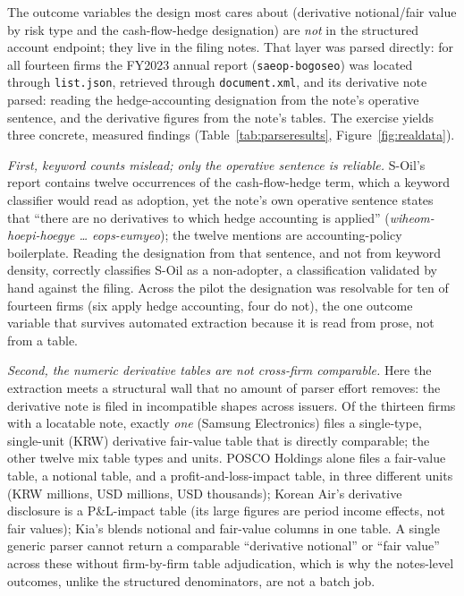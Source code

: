 \documentclass[11pt,a4paper]{article}
\begin{document}
The outcome variables the design most cares about (derivative notional/fair value by risk type and the cash-flow-hedge designation) are \emph{not} in the structured account endpoint; they live in the filing notes. That layer was parsed directly: for all fourteen firms the FY2023 annual report (\texttt{saeop-bogoseo}) was located through \texttt{list.json}, retrieved through \texttt{document.xml}, and its derivative note parsed: reading the hedge-accounting designation from the note's operative sentence, and the derivative figures from the note's tables. The exercise yields three concrete, measured findings (Table~\ref{tab:parseresults}, Figure~\ref{fig:realdata}).

\emph{First, keyword counts mislead; only the operative sentence is reliable.} S-Oil's report contains twelve occurrences of the cash-flow-hedge term, which a keyword classifier would read as adoption, yet the note's own operative sentence states that ``there are no derivatives to which hedge accounting is applied'' (\emph{wiheom-hoepi-hoegye \ldots{} eops-eumyeo}); the twelve mentions are accounting-policy boilerplate. Reading the designation from that sentence, and not from keyword density, correctly classifies S-Oil as a non-adopter, a classification validated by hand against the filing. Across the pilot the designation was resolvable for ten of fourteen firms (six apply hedge accounting, four do not), the one outcome variable that survives automated extraction because it is read from prose, not from a table.

\emph{Second, the numeric derivative tables are not cross-firm comparable.} Here the extraction meets a structural wall that no amount of parser effort removes: the derivative note is filed in incompatible shapes across issuers. Of the thirteen firms with a locatable note, exactly \emph{one} (Samsung Electronics) files a single-type, single-unit (KRW) derivative fair-value table that is directly comparable; the other twelve mix table types and units. POSCO Holdings alone files a fair-value table, a notional table, and a profit-and-loss-impact table, in three different units (KRW millions, USD millions, USD thousands); Korean Air's derivative disclosure is a P\&L-impact table (its large figures are period income effects, not fair values); Kia's blends notional and fair-value columns in one table. A single generic parser cannot return a comparable ``derivative notional'' or ``fair value'' across these without firm-by-firm table adjudication, which is why the notes-level outcomes, unlike the structured denominators, are not a batch job.
\end{document}
